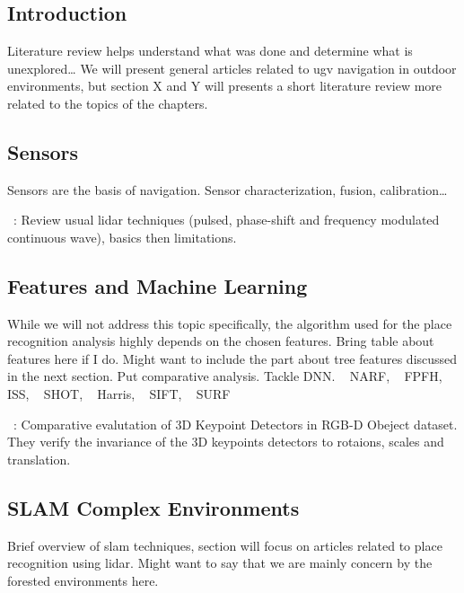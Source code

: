 \chapter{\chapzerotitle}
\label{chap:literature_review}


\section{Introduction}
Literature review helps understand what was done and determine what is unexplored\dots
We will present general articles related to ugv navigation in outdoor environments, but section X and Y will presents a short literature review more related to the topics of the chapters.


\section{Sensors}
Sensors are the basis of navigation. Sensor characterization, fusion, calibration\dots

~\cite{Bosch2001}:
Review usual lidar techniques (pulsed, phase-shift and frequency modulated continuous wave), basics then limitations.


\section{Features and Machine Learning}
While we will not address this topic specifically, the algorithm used for the place recognition analysis highly depends on the chosen features.  
Bring table about features here if I do. Might want to include the part about tree features discussed in the next section. Put comparative analysis. Tackle DNN.
~\cite{Steder2011a} NARF, ~\cite{Rusu2009} FPFH, ~\cite{Yu2009} ISS, ~\cite{Tombari2010} SHOT, ~\cite{Harris1988} Harris, ~\cite{Lowe2004} SIFT, ~\cite{Bay2006} SURF

~\cite{Filipe2014}:
Comparative evalutation of 3D Keypoint Detectors in RGB-D Obeject dataset. They verify the invariance of the 3D keypoints detectors to rotaions, scales and translation.


\section{SLAM Complex Environments}
Brief overview of slam techniques, section will focus on articles related to place recognition using lidar. Might want to say that we are mainly concern by the forested environments here. 

